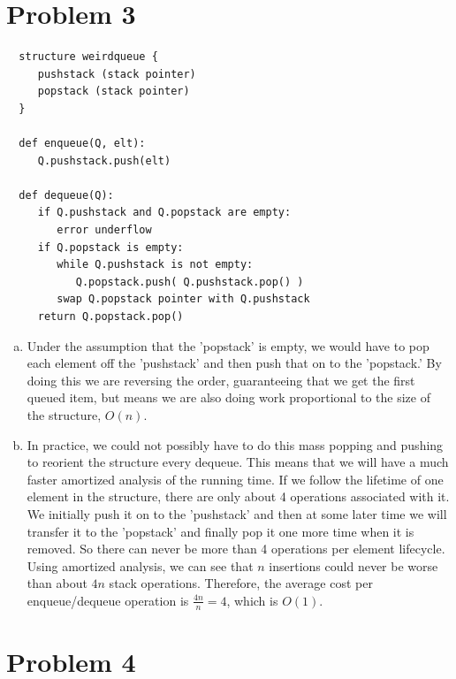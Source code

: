 \documentclass[a4paper,12pt]{article}
\begin{document}
\section*{Problem 3}


\begin{verbatim}
  structure weirdqueue {
     pushstack (stack pointer)
     popstack (stack pointer)
  }

  def enqueue(Q, elt):
     Q.pushstack.push(elt)

  def dequeue(Q):
     if Q.pushstack and Q.popstack are empty:
        error underflow
     if Q.popstack is empty:
        while Q.pushstack is not empty:
           Q.popstack.push( Q.pushstack.pop() )
        swap Q.popstack pointer with Q.pushstack
     return Q.popstack.pop()

\end{verbatim}


\begin{enumerate}[a)]

\item Under the assumption that the 'popstack' is empty, we would have
  to pop each element off the 'pushstack' and then push that on to the
  'popstack.' By doing this we are reversing the order, guaranteeing
  that we get the first queued item, but means we are also doing work
  proportional to the size of the structure, $O(n)$.

\item In practice, we could not possibly have to do this mass popping
  and pushing to reorient the structure every dequeue. This means that
  we will have a much faster amortized analysis of the running
  time. If we follow the lifetime of one element in the structure,
  there are only about 4 operations associated with it. We initially
  push it on to the 'pushstack' and then at some later time we will
  transfer it to the 'popstack' and finally pop it one more time when
  it is removed. So there can never be more than 4 operations per
  element lifecycle. Using amortized analysis, we can see that $n$
  insertions could never be worse than about $4n$ stack
  operations. Therefore, the average cost per enqueue/dequeue
  operation is $\frac{4n}{n} = 4$, which is $O(1)$.
  
\end{enumerate}

\section*{Problem 4}
\end{document}
